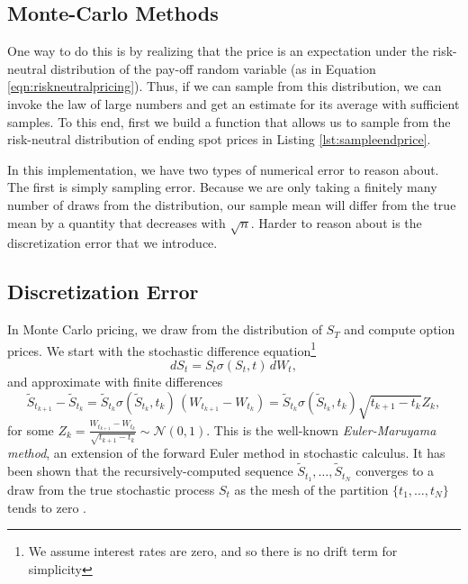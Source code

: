 \documentclass[12pt]{article}
\numberwithin{equation}{section}
\newcommand{\Norm}{\mathcal N}
\begin{document}
\subsection{Monte-Carlo Methods}
\label{subsec:montecarlopricing}

One way to do this is by realizing that the price is an expectation under the
risk-neutral distribution of the pay-off random variable (as in Equation
\ref{eqn:riskneutralpricing}). Thus, if we can sample
from this distribution, we can invoke the law of large numbers and get an
estimate for its average with sufficient samples. To this end, first we build a
function that allows us to sample from the risk-neutral distribution of ending
spot prices in Listing \ref{lst:sampleendprice}.

In this implementation, we have two types of numerical error to reason about.
The first is simply sampling error. Because we are only taking a finitely many
number of draws from the distribution, our sample mean will differ from the true
mean by a quantity that decreases with $\sqrt{n}$. Harder to reason about is the
discretization error that we introduce. 


\subsection{Discretization Error}
In Monte Carlo pricing, we draw from the distribution of $S_T$ and compute option prices. We start with the stochastic difference equation\footnote{We assume interest rates are zero, and so there is no drift term for simplicity} \[
dS_t = S_t \sigma(S_t,t) \, dW_t,
\]
and approximate with finite differences 
\begin{equation}
    \label{eq:euler-maruyama}
    \tilde S_{t_{k+1}} - \tilde S_{t_k} = \tilde S_{t_k} \sigma(\tilde S_{t_k}, t_k)\, (W_{t_{k+1}} - W_{t_k}) = \tilde S_{t_k} \sigma(\tilde S_{t_k}, t_k) \sqrt{t_{k+1}-t_k} Z_k,
\end{equation}
for some $Z_k = \frac{W_{t_{k+1}} - W_{t_k}}{\sqrt{t_{k+1}-t_k}} \sim \Norm(0,1)$. This is the well-known \emph{Euler-Maruyama method}, an extension of the forward Euler method in stochastic calculus. It has been shown that the recursively-computed sequence $\tilde S_{t_1},\ldots, \tilde S_{t_N}$ converges to a draw from the true stochastic process $S_t$ as the mesh of the partition $\{t_1,\ldots,t_N\}$ tends to zero \citep{dobrow2016introduction}.  
\end{document}
